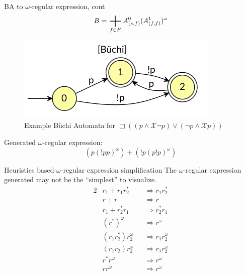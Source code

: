 \documentclass[handout]{beamer}
\newcommand{\alwaysf}{\Box}
\newcommand{\nexttf}{\mathcal{X}}
\newcommand{\Buchi}{B\"{u}chi }
\DeclareMathOperator*{\bigplus}{\scalerel*{+}{\sum}}
\begin{document}
\begin{frame}{BA to $\omega$-regular expression, cont}
    \[
        B = \bigplus_{f \in F} A_{(s, f)}^0 (A_{(f, f)}^1)^{\omega}
    \]
    \begin{example}
        \begin{figure}
        \centering
        \includegraphics[scale=0.5]{img/buchi-ex.png}
        \caption{Example \Buchi Automata for $\alwaysf ((p \wedge \nexttf \neg p) \vee (\neg p \wedge \nexttf p))$}
    \end{figure}
    Generated $\omega$-regular expression:
    \[
        (p(!pp)^{\omega}) + (!p(p!p)^{\omega})
    \]
    \end{example}
\end{frame}

\begin{frame}{Heuristics based $\omega$-regular expression simplification}
    The $\omega$-regular expression generated may not be the ``simplest'' to visualize.
    \begin{alignat*}{2}
        & r_1 + r_1r_2^* && \Longrightarrow r_1r_2^* \\
        & r + r && \Longrightarrow r \\
        & r_1 + r_2^*r_1 && \Longrightarrow r_2^*r_1 \\
        & (r^*)^{\omega} && \Longrightarrow r^{\omega} \\
        & (r_1r_2^*)r_2^{\omega} && \Longrightarrow r_1r_2^{\omega} \\
        & (r_1r_2)r_2^{\omega} && \Longrightarrow r_1r_2^{\omega} \\
        & r^*r^{\omega} && \Longrightarrow r^{\omega} \\
        & rr^{\omega} && \Longrightarrow r^{\omega}
    \end{alignat*}
\end{frame}
\end{document}
